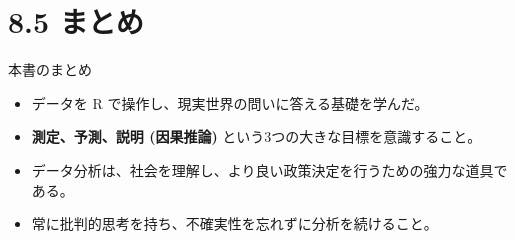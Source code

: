 \documentclass[
  ignorenonframetext,
]{beamer}
\providecommand{\tightlist}{%
  \setlength{\itemsep}{0pt}\setlength{\parskip}{0pt}}
\begin{document}
\hypertarget{ux307eux3068ux3081}{%
\section{8.5 まとめ}\label{ux307eux3068ux3081}}

\begin{frame}{本書のまとめ}
\protect\hypertarget{ux672cux66f8ux306eux307eux3068ux3081}{}
\begin{itemize}
\tightlist
\item
  データを R で操作し、現実世界の問いに答える基礎を学んだ。
\item
  \textbf{測定、予測、説明 (因果推論)}
  という3つの大きな目標を意識すること。
\item
  データ分析は、社会を理解し、より良い政策決定を行うための強力な道具である。
\item
  常に批判的思考を持ち、不確実性を忘れずに分析を続けること。
\end{itemize}
\end{frame}
\end{document}
